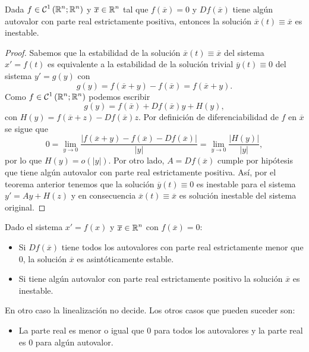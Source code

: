 \begin{colorary}
Dada $\displaystyle f \in \mathcal{C}^{1}\left(\mathbb{R}^{n}; \mathbb{R}^{n}\right) $ y $\displaystyle \overline{x}\in \mathbb{R}^{n} $ tal que $\displaystyle f\left(\overline{x}\right)=0 $ y $\displaystyle Df\left(\overline{x}\right) $ tiene algún autovalor con parte real estrictamente positiva, entonces la solución $\displaystyle \overline{x}\left(t\right)\equiv \overline{x} $ es inestable.
\end{colorary}
\begin{proof}
Sabemos que la estabilidad de la solución $\displaystyle \overline{x}\left(t\right)\equiv \overline{x} $ del sistema $\displaystyle x' = f\left(t\right) $ es equivalente a la estabilidad de la solución trivial $\displaystyle \overline{y}\left(t\right)\equiv 0 $ del sistema $\displaystyle y' = g\left(y\right) $ con 
\[g\left(y\right)=f\left(\overline{x}+y\right)-f\left(\overline{x}\right)=f\left(\overline{x}+y\right) .\]
Como $\displaystyle f \in \mathcal{C}^{1}\left(\mathbb{R}^{n}; \mathbb{R}^{n}\right) $ podemos escribir
\[g\left(y\right)=f\left(\overline{x}\right) + Df\left(\overline{x}\right)y + H\left(y\right) ,\]
con $\displaystyle H\left(y\right)=f\left(\overline{x}+z\right)-Df\left(\overline{x}\right)z $. Por definición de diferenciabilidad de $\displaystyle f $ en $\displaystyle \overline{x} $ se sigue que 
\[0 = \lim_{y \to 0}\frac{ \left|f\left(\overline{x}+y\right)-f\left(\overline{x}\right)-Df\left(\overline{x}\right)\right|}{ \left|y\right|}= \lim_{y \to 0}\frac{ \left|H\left(y\right)\right|}{ \left|y\right|} ,\]
por lo que $\displaystyle H\left(y\right)=o\left( \left|y\right|\right) $. Por otro lado, $\displaystyle A = Df\left(\overline{x}\right) $ cumple por hipótesis que tiene algún autovalor con parte real estrictamente positiva. Así, por el teorema anterior tenemos que la solución $\displaystyle \overline{y}\left(t\right)\equiv 0 $ es inestable para el sistema $\displaystyle y' = Ay + H\left(z\right) $ y en consecuencia $\displaystyle \overline{x}\left(t\right)\equiv \overline{x} $ es solución inestable del sistema original. 
\end{proof}
\begin{observation}[Resumen]
Dado el sistema $\displaystyle x' = f\left(x\right) $ y $\displaystyle \overline{x}\in \mathbb{R}^{n} $ con $\displaystyle f\left(\overline{x}\right)=0 $:
\begin{itemize}
\item Si $\displaystyle Df\left(\overline{x}\right) $ tiene todos los autovalores con parte real estrictamente menor que 0, la solución $\displaystyle \overline{x} $ es asintóticamente estable.
\item Si tiene algún autovalor con parte real estrictamente positivo la solución $\displaystyle \overline{x} $ es inestable.
\end{itemize}
  En otro caso la linealización no decide. Los otros casos que pueden suceder son:
\begin{itemize}
\item La parte real es menor o igual que 0 para todos los autovalores y la parte real es 0 para algún autovalor.
\end{itemize}
\end{observation}


